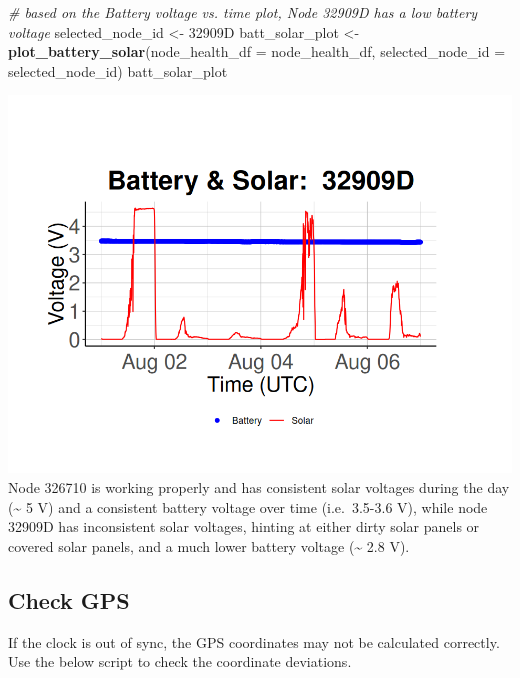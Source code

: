 \documentclass[
]{book}
\newenvironment{Shaded}{\begin{snugshade}}{\end{snugshade}}
\newcommand{\AttributeTok}[1]{\textcolor[rgb]{0.13,0.29,0.53}{#1}}
\newcommand{\CommentTok}[1]{\textcolor[rgb]{0.56,0.35,0.01}{\textit{#1}}}
\newcommand{\FunctionTok}[1]{\textcolor[rgb]{0.13,0.29,0.53}{\textbf{#1}}}
\newcommand{\NormalTok}[1]{#1}
\newcommand{\OtherTok}[1]{\textcolor[rgb]{0.56,0.35,0.01}{#1}}
\newcommand{\StringTok}[1]{\textcolor[rgb]{0.31,0.60,0.02}{#1}}
\begin{document}
\begin{Shaded}
\begin{Highlighting}[]
\CommentTok{\# based on the Battery voltage vs. time plot, Node 32909D has a low battery voltage}
\NormalTok{selected\_node\_id }\OtherTok{\textless{}{-}} \StringTok{\textquotesingle{}32909D\textquotesingle{}}
\NormalTok{batt\_solar\_plot }\OtherTok{\textless{}{-}} \FunctionTok{plot\_battery\_solar}\NormalTok{(}\AttributeTok{node\_health\_df =}\NormalTok{ node\_health\_df, }
                                      \AttributeTok{selected\_node\_id =}\NormalTok{ selected\_node\_id)}
\NormalTok{batt\_solar\_plot }
\end{Highlighting}
\end{Shaded}

\includegraphics{images/node_check_1.1.3_node_specific_battery_solar_bad.png}
Node 326710 is working properly and has consistent solar voltages during the day (\textasciitilde{} 5 V) and a consistent battery voltage over time (i.e.~3.5-3.6 V), while node 32909D has inconsistent solar voltages, hinting at either dirty solar panels or covered solar panels, and a much lower battery voltage (\textasciitilde{} 2.8 V).

\subsection{Check GPS}\label{check-gps}

If the clock is out of sync, the GPS coordinates may not be calculated correctly. Use the below script to check the coordinate deviations.
\end{document}
